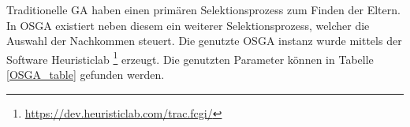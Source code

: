 \documentclass{IEEEtran}
\begin{document}
Traditionelle GA haben einen primären Selektionsprozess zum Finden der Eltern. In OSGA existiert neben diesem ein weiterer Selektionsprozess, 
welcher die Auswahl der Nachkommen steuert\cite{affenzeller-wagner}. Die genutzte OSGA instanz wurde mittels der Software Heuristiclab \footnote{\url{https://dev.heuristiclab.com/trac.fcgi/}} erzeugt. 
Die genutzten Parameter können in Tabelle \ref{OSGA_table} gefunden werden. 

\end{document}
